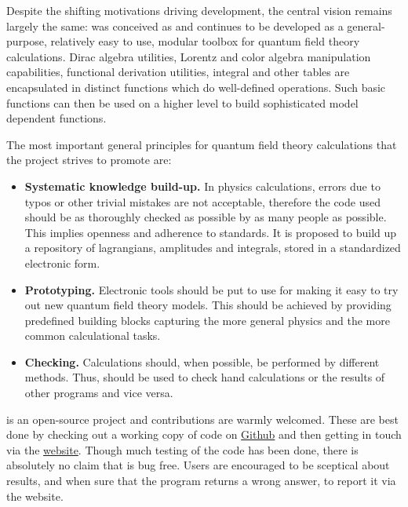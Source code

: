 Despite the shifting motivations driving development, the central vision remains
largely the same:
\fc was conceived as and continues to be developed as a general-purpose, relatively easy to use,
modular toolbox for quantum field theory calculations.
Dirac algebra utilities, Lorentz and color algebra manipulation capabilities,
functional derivation utilities, integral and other tables are encapsulated in
distinct functions which do well-defined operations.
Such basic functions can then be used on a higher level to build sophisticated model dependent
functions.

The most important general principles for quantum field theory calculations that the \fc project
strives to promote are:

\begin{itemize}

%

\item{{\bf Systematic knowledge build-up.} In physics calculations, errors due to typos or
other trivial mistakes are not acceptable, therefore the code used should be as thoroughly
checked as possible by as many people as possible. This implies openness and adherence to
standards. It is proposed to build up a repository of lagrangians, amplitudes and integrals,
stored in a standardized electronic form.}

\item{{\bf Prototyping.} Electronic tools should be put to use for making it easy to
try out new quantum field theory models. This should be achieved by providing predefined
building blocks capturing the more general physics and the more common calculational tasks.}

\item{{\bf Checking.} Calculations should, when possible, be performed by different methods.
Thus, \fc should be used to check hand calculations or the results of other programs and
vice versa.}

\end{itemize}

\fc is an open-source project and contributions are warmly welcomed. These are
best done by checking out a working copy of code on
\href{http://github.org/FeynCalc/feyncalc}{Github} and then getting in touch via
the \href{http://www.feyncalc.org/}{website}. Though
much testing of the code has been done, there is absolutely no claim that \fc is
bug free. Users are encouraged to be sceptical about results, and when sure that
the program returns a wrong answer, to report it via the website.

